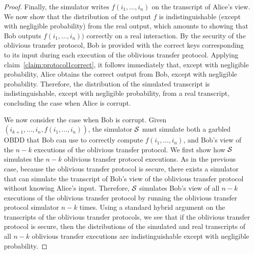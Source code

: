\begin{proof}
Finally, the simulator writes $f(i_1,\ldots,i_n)$ on the transcript
of Alice's view. We now show that the distribution of the output $f$
is indistinguishable (except with negligible probability) from the
real output, which amounts to showing that Bob outputs
$f(i_1,\ldots,i_n))$ correctly on a real interaction. By the security
of the oblivious transfer protocol, Bob is provided with the correct
keys corresponding to its input during each execution of the oblivious
transfer protocol. Applying claim~\ref{claim:protocol1correct}, it
follows immediately that, except with negligible probability, Alice
obtains the correct output from Bob, except with negligible
probability. Therefore, the distribution of the simulated transcript
is indistinguishable, except with negligible probability, from a real
transcript, concluding the case when Alice is corrupt.

We now consider the case when Bob is corrupt. Given
$(i_{k+1},\ldots,i_n, f(i_1,\ldots,i_n))$, the simulator ${\mathcal{S}}$ must
simulate both a garbled OBDD that Bob can use to correctly compute
$f(i_1,\ldots,i_n)$, and Bob's view of the $n-k$ executions of the
oblivious transfer protocol. We first show how ${\mathcal{S}}$ simulates the
$n-k$ oblivious transfer protocol executions. As in the previous case,
because the oblivious transfer protocol is secure, there exists a
simulator that can simulate the transcript of Bob's view of the
oblivious transfer protocol without knowing Alice's input. Therefore,
${\mathcal{S}}$ simulates Bob's view of all $n-k$ executions of the
oblivious transfer protocol by running the oblivious transfer protocol
simulator $n-k$ times. Using a standard hybrid argument on the
transcripts of the oblivious transfer protocols, we see that if the
oblivious transfer protocol is secure, then the distributions of the
simulated and real transcripts of all $n-k$ oblivious transfer
executions are indistinguishable except with negligible probability.


\end{proof}
